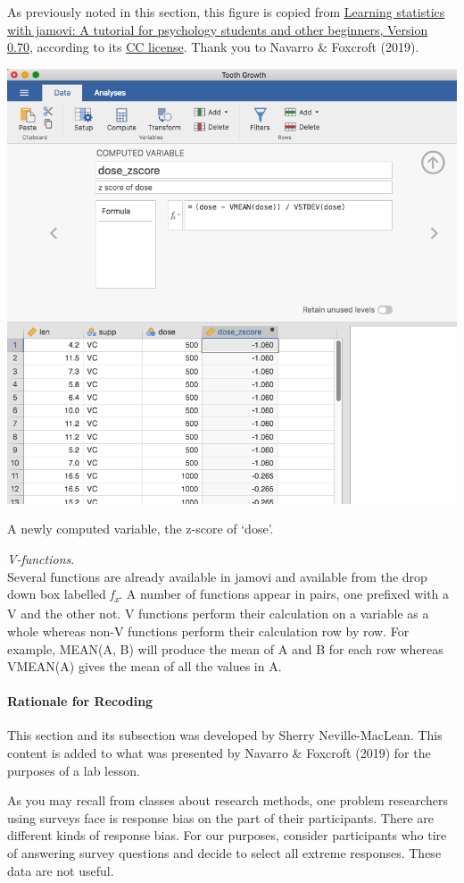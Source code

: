 \documentclass[
]{book}
\begin{document}
As previously noted in this section, this figure is copied from \href{https://www.learnstatswithjamovi.com/}{Learning statistics with jamovi: A tutorial for psychology students and other beginners, Version 0.70}, according to its \href{https://creativecommons.org/licenses/by-sa/4.0/deed.ast}{CC license}. Thank you to Navarro \& Foxcroft (2019).

\includegraphics[width=0.75\linewidth]{img/computedvariable}

\caption{A newly computed variable, the z-score of `dose'.}

\emph{V-functions}.\\
Several functions are already available in jamovi and available from the drop down box labelled \emph{f\textsubscript{x}}. A number of functions appear in pairs, one prefixed with a V and the other not. V functions perform their calculation on a variable as a whole whereas non-V functions perform their calculation row by row. For example, MEAN(A, B) will produce the mean of A and B for each row whereas VMEAN(A) gives the mean of all the values in A.

\hypertarget{rationale-for-recoding}{%
\paragraph{Rationale for Recoding}\label{rationale-for-recoding}}

This section and its subsection was developed by Sherry Neville-MacLean. This content is added to what was presented by Navarro \& Foxcroft (2019) for the purposes of a lab lesson.

As you may recall from classes about research methods, one problem researchers using surveys face is response bias on the part of their participants. There are different kinds of response bias. For our purposes, consider participants who tire of answering survey questions and decide to select all extreme responses. These data are not useful.
\end{document}
